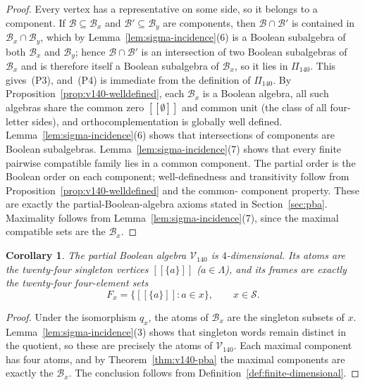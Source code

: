 \documentclass{article}   	%
\theoremstyle{plain}
\newtheorem{corollary}[theorem]{Corollary}
\theoremstyle{definition}
\theoremstyle{remark}
\begin{document}
\begin{proof}
Every vertex has a representative on some side, so it belongs to a component.
If $\mathcal B\subseteq\mathcal B_x$ and $\mathcal B'\subseteq\mathcal B_y$ are
components, then $\mathcal B\cap\mathcal B'$ is contained in
$\mathcal B_x\cap\mathcal B_y$, which by Lemma~\ref{lem:sigma-incidence}(6) is a
Boolean subalgebra of both $\mathcal B_x$ and $\mathcal B_y$; hence
$\mathcal B\cap\mathcal B'$ is an intersection of two Boolean subalgebras of
$\mathcal B_x$ and is therefore itself a Boolean subalgebra of
$\mathcal B_x$, so it lies in $\Pi_{140}$.  This gives~\rm(P3),
and~\rm(P4) is immediate from the definition of $\Pi_{140}$.
By Proposition~\ref{prop:v140-welldefined}, each $\mathcal B_x$ is a Boolean
algebra, all such algebras share the common zero $[[\emptyset]]$ and common unit
(the class of all four-letter sides), and orthocomplementation is globally
well defined.  Lemma~\ref{lem:sigma-incidence}(6) shows that intersections of
components are Boolean subalgebras.  Lemma~\ref{lem:sigma-incidence}(7) shows
that every finite pairwise compatible family lies in a common component.  The
partial order is the Boolean order on each component; well-definedness and
transitivity follow from Proposition~\ref{prop:v140-welldefined} and the common-
component property.  These are exactly the partial-Boolean-algebra axioms stated
in Section~\ref{sec:pba}.  Maximality follows from
Lemma~\ref{lem:sigma-incidence}(7), since the maximal compatible sets are the
$\mathcal B_x$.
\end{proof}

\begin{corollary}
\label{cor:v140-dimension}
The partial Boolean algebra $\mathcal V_{140}$ is $4$-dimensional.  Its atoms are
the twenty-four singleton vertices $[[\{a\}]]$ ($a\in\Lambda$), and its frames
are exactly the twenty-four four-element sets
\[
F_x=\{[[\{a\}]]:a\in x\},\qquad x\in\mathcal S.
\]
\end{corollary}

\begin{proof}
Under the isomorphism $q_x$, the atoms of $\mathcal B_x$ are the singleton
subsets of $x$.  Lemma~\ref{lem:sigma-incidence}(3) shows that singleton words
remain distinct in the quotient, so these are precisely the atoms of
$\mathcal V_{140}$.  Each maximal component has four atoms, and by
Theorem~\ref{thm:v140-pba} the maximal components are exactly the
$\mathcal B_x$.  The conclusion follows from Definition~\ref{def:finite-dimensional}.
\end{proof}
\end{document}
